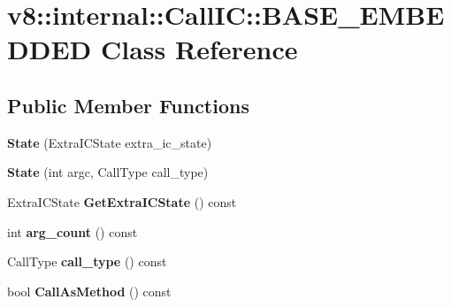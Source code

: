 \hypertarget{classv8_1_1internal_1_1_call_i_c_1_1_b_a_s_e___e_m_b_e_d_d_e_d}{}\section{v8\+:\+:internal\+:\+:Call\+I\+C\+:\+:B\+A\+S\+E\+\_\+\+E\+M\+B\+E\+D\+D\+E\+D Class Reference}
\label{classv8_1_1internal_1_1_call_i_c_1_1_b_a_s_e___e_m_b_e_d_d_e_d}
\subsection*{Public Member Functions}
\begin{DoxyCompactItemize}
\item 
\hypertarget{classv8_1_1internal_1_1_call_i_c_1_1_b_a_s_e___e_m_b_e_d_d_e_d_ad639395b275f776e9ffd26d2161813a4}{}{\bfseries State} (Extra\+I\+C\+State extra\+\_\+ic\+\_\+state)\label{classv8_1_1internal_1_1_call_i_c_1_1_b_a_s_e___e_m_b_e_d_d_e_d_ad639395b275f776e9ffd26d2161813a4}

\item 
\hypertarget{classv8_1_1internal_1_1_call_i_c_1_1_b_a_s_e___e_m_b_e_d_d_e_d_a3d54e2b1ef62d6a363c391895e3b5e58}{}{\bfseries State} (int argc, Call\+Type call\+\_\+type)\label{classv8_1_1internal_1_1_call_i_c_1_1_b_a_s_e___e_m_b_e_d_d_e_d_a3d54e2b1ef62d6a363c391895e3b5e58}

\item 
\hypertarget{classv8_1_1internal_1_1_call_i_c_1_1_b_a_s_e___e_m_b_e_d_d_e_d_a552af445cb53b51d60b082c4bfbbf709}{}Extra\+I\+C\+State {\bfseries Get\+Extra\+I\+C\+State} () const \label{classv8_1_1internal_1_1_call_i_c_1_1_b_a_s_e___e_m_b_e_d_d_e_d_a552af445cb53b51d60b082c4bfbbf709}

\item 
\hypertarget{classv8_1_1internal_1_1_call_i_c_1_1_b_a_s_e___e_m_b_e_d_d_e_d_abf7b91587a4bbf9949710da953b38456}{}int {\bfseries arg\+\_\+count} () const \label{classv8_1_1internal_1_1_call_i_c_1_1_b_a_s_e___e_m_b_e_d_d_e_d_abf7b91587a4bbf9949710da953b38456}

\item 
\hypertarget{classv8_1_1internal_1_1_call_i_c_1_1_b_a_s_e___e_m_b_e_d_d_e_d_a001d24da84c639d0b4f3e712540cdfdb}{}Call\+Type {\bfseries call\+\_\+type} () const \label{classv8_1_1internal_1_1_call_i_c_1_1_b_a_s_e___e_m_b_e_d_d_e_d_a001d24da84c639d0b4f3e712540cdfdb}

\item 
\hypertarget{classv8_1_1internal_1_1_call_i_c_1_1_b_a_s_e___e_m_b_e_d_d_e_d_a6b86418aba95d02f7846927f4c2d441e}{}bool {\bfseries Call\+As\+Method} () const \label{classv8_1_1internal_1_1_call_i_c_1_1_b_a_s_e___e_m_b_e_d_d_e_d_a6b86418aba95d02f7846927f4c2d441e}

\end{DoxyCompactItemize}
